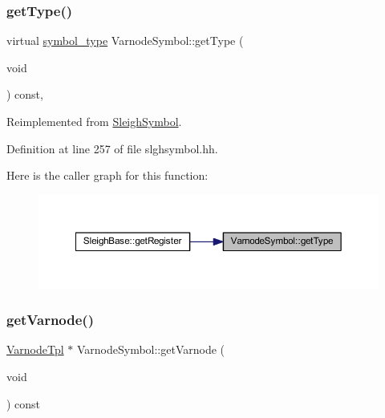 \subsubsection{\texorpdfstring{getType()}{getType()}}
{\footnotesize\ttfamily virtual \mbox{\hyperlink{class_sleigh_symbol_aba70f7f332fd63488c5ec4bd7807db41}{symbol\+\_\+type}} Varnode\+Symbol\+::get\+Type (\begin{DoxyParamCaption}\item[{void}]{ }\end{DoxyParamCaption}) const\hspace{0.3cm}{\ttfamily [inline]}, {\ttfamily [virtual]}}



Reimplemented from \mbox{\hyperlink{class_sleigh_symbol_a2f6e5903e461084c29f95ea024883950}{Sleigh\+Symbol}}.



Definition at line 257 of file slghsymbol.\+hh.

Here is the caller graph for this function\+:
\nopagebreak
\begin{figure}[H]
\begin{center}
\leavevmode
\includegraphics[width=350pt]{class_varnode_symbol_a15662a0fcf1825811b7729bee1a5a2a5_icgraph}
\end{center}
\end{figure}
\mbox{\label{class_varnode_symbol_aae6d99071fdc4ac8e55d78845898669f}} 
\subsubsection{\texorpdfstring{getVarnode()}{getVarnode()}}
{\footnotesize\ttfamily \mbox{\hyperlink{class_varnode_tpl}{Varnode\+Tpl}} $\ast$ Varnode\+Symbol\+::get\+Varnode (\begin{DoxyParamCaption}\item[{void}]{ }\end{DoxyParamCaption}) const\hspace{0.3cm}{\ttfamily [virtual]}}



